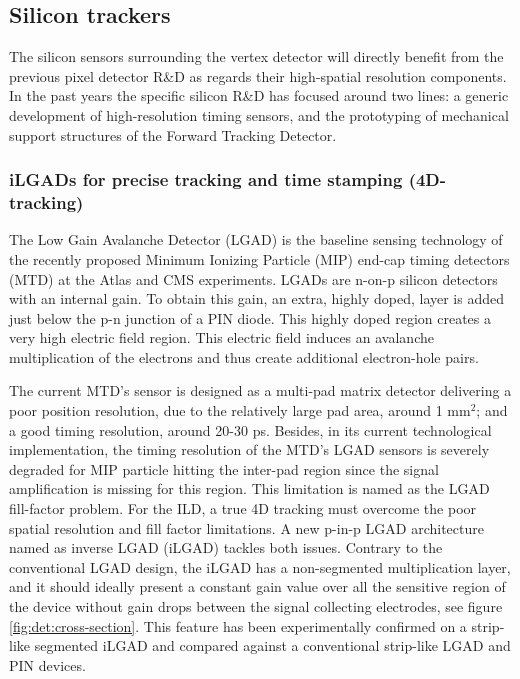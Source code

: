 \subsection{Silicon trackers}

The silicon sensors surrounding the vertex detector will directly benefit from the previous pixel detector R\&D as regards their high-spatial resolution components. In the past years the specific silicon R\&D has focused around two lines: a generic development of high-resolution timing sensors, and the prototyping of mechanical support structures of the Forward Tracking Detector.

\subsubsection{iLGADs for precise tracking and time stamping (4D-tracking)}

The Low Gain Avalanche Detector (LGAD) is the baseline sensing technology of the recently proposed Minimum Ionizing Particle (MIP) end-cap timing detectors (MTD) at the Atlas and CMS experiments. LGADs are n-on-p silicon detectors with an internal gain. To obtain this gain, an extra, highly doped, layer is added just below the p-n junction of a PIN diode. This highly doped region creates a very high electric field region. This electric field induces an avalanche multiplication of the electrons and thus create additional electron-hole pairs\cite{PELLEGRINI201412}. 

The current MTD's sensor is designed as a multi-pad matrix detector delivering a poor position resolution, due to the relatively large pad area, around 1 mm$^2$; and a good timing resolution, around 20-30 ps. Besides, in its current technological implementation, the timing resolution of the MTD's LGAD sensors is severely degraded for MIP particle hitting the inter-pad region since the signal amplification is missing for this region. This limitation is named as the LGAD fill-factor problem. For the ILD, a true 4D tracking  must overcome the poor spatial resolution and fill factor limitations. A new p-in-p LGAD architecture named as inverse LGAD (iLGAD) tackles both issues\cite{Carulla_2016}. Contrary to the conventional LGAD design, the iLGAD has a non-segmented multiplication layer, and it should ideally present a constant gain value over all the sensitive region of the device without gain drops between the signal collecting electrodes, see figure\,\ref{fig:det:cross-section}. This feature has been experimentally confirmed on a strip-like segmented iLGAD and compared against a conventional strip-like LGAD and PIN devices\cite{Curras2019}. 

